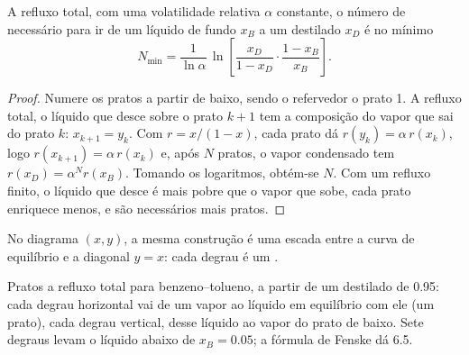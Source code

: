 \begin{proposition}[Fenske]\label{prop:b2:liquid-vapour-diagrams:fenske}
A refluxo total, com uma volatilidade relativa $\alpha$ constante, o número de
 necessário para ir de um líquido de fundo $x_B$ a um destilado
$x_D$ é no mínimo
\[
  N_{\min} = \frac{1}{\ln\alpha}\,\ln\!\left[\frac{x_D}{1 - x_D}\cdot\frac{1 - x_B}{x_B}\right] .
\]
\end{proposition}

\begin{proof}
Numere os pratos a partir de baixo, sendo o refervedor o prato 1. A refluxo total,
o líquido que desce sobre o prato $k + 1$ tem a composição do vapor que
sai do prato $k$: $x_{k+1} = y_k$. Com $r = x/(1 - x)$, cada prato dá
$r(y_k) = \alpha\,r(x_k)$, logo $r(x_{k+1}) = \alpha\,r(x_k)$ e, após $N$
pratos, o vapor condensado tem $r(x_D) = \alpha^N r(x_B)$. Tomando os
logaritmos, obtém-se $N$. Com um refluxo finito, o líquido que desce é mais
pobre que o vapor que sobe, cada prato enriquece menos, e são necessários
mais pratos.
\end{proof}

No diagrama $(x, y)$, a mesma construção é uma escada entre a curva de
equilíbrio e a diagonal $y = x$: cada degrau é um .

\begin{omfigure}

{\small Pratos a refluxo total para benzeno--tolueno, a partir de um destilado
de 0.95: cada degrau horizontal vai de um vapor ao líquido em equilíbrio com
ele (um prato), cada degrau vertical, desse líquido ao vapor do prato de
baixo. Sete degraus levam o líquido abaixo de $x_B = 0.05$; a fórmula de
Fenske dá 6.5.}
\end{omfigure}

